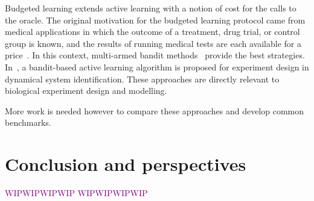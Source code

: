 \documentclass{llncs}
\newcommand{\wip}[1]{\textcolor{Purple}{WIPWIPWIPWIP #1 WIPWIPWIPWIP}}
\begin{document}
Budgeted learning extends active learning with a notion of cost for the calls to the oracle.
The original motivation for the budgeted learning protocol came from medical applications in which the outcome of a treatment,
drug trial, or control group is known, and the results of running medical tests are each available for a price~\cite{DZBSM13ml}.
In this context, multi-armed bandit methods~\cite{DBSSZ07icdm} provide the best strategies.
In~\cite{LMALS14ecml}, a bandit-based active learning algorithm is proposed for experiment design in dynamical system identification.
These approaches are directly relevant to biological experiment design and modelling. %

More work is needed however to compare these approaches and develop common benchmarks.


\section{Conclusion and perspectives}
\wip{}



\end{document}
